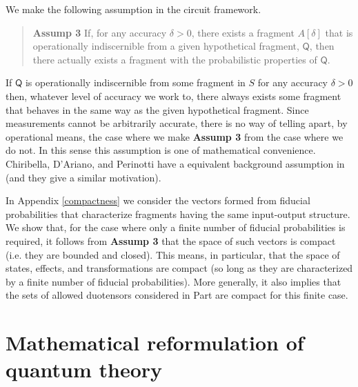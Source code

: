 \documentclass[10pt]{article}
\begin{document}
We make the following assumption in the circuit framework.
\begin{quote}
{\bf Assump 3} If, for any accuracy $\delta>0$, there exists a fragment $A[\delta]$ that is operationally indiscernible from a given hypothetical fragment, $\mathsf Q$, then there actually exists a fragment with the probabilistic properties of $\mathsf Q$.
\end{quote}
If $\mathsf{Q}$ is operationally indiscernible from some fragment in $S$ for any accuracy $\delta>0$ then, whatever level of accuracy we work to, there always exists some fragment that behaves in the same way as the given hypothetical fragment.  Since measurements cannot be arbitrarily accurate, there is no way of telling apart, by operational means, the case where we make {\bf Assump 3} from the case where we do not.  In this sense this assumption is one of mathematical convenience.   Chiribella, D'Ariano, and Perinotti have a equivalent background assumption in \cite{chiribella2010informational} (and they give a similar motivation).

In Appendix \ref{compactness}  we consider the vectors formed from fiducial probabilities that characterize fragments having the same input-output structure.  We show that, for the case where only a finite number of fiducial probabilities is required, it follows from {\bf Assump 3} that the space of such vectors is compact (i.e. they are bounded and closed).   This means, in particular, that the space of states, effects, and transformations are compact (so long as they are characterized by a finite number of fiducial probabilities).  More generally, it also implies that the sets of allowed duotensors considered in Part \ref{theduotensorframework} are compact for this finite case.










\newpage



\part{Mathematical reformulation of quantum theory}\label{theduotensorframework}
\end{document}
